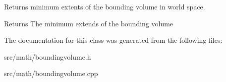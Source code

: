 Returns minimum extents of the bounding volume in world space. 

\begin{DoxyReturn}{Returns}
The minimum extends of the bounding volume 
\end{DoxyReturn}


The documentation for this class was generated from the following files\+:\begin{DoxyCompactItemize}
\item 
src/math/boundingvolume.\+h\item 
src/math/boundingvolume.\+cpp\end{DoxyCompactItemize}
